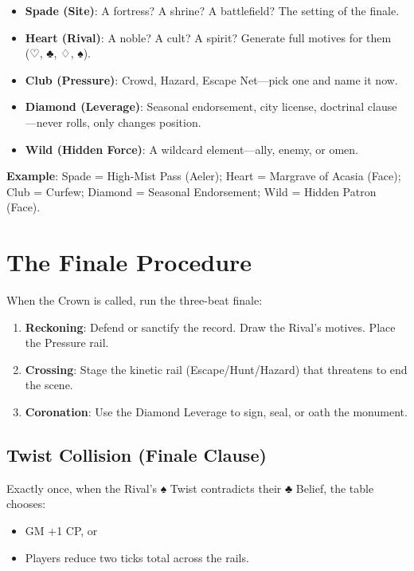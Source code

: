 \begin{itemize}
    \item \textbf{Spade (Site)}: A fortress? A shrine? A battlefield? The setting of the finale.
    \item \textbf{Heart (Rival)}: A noble? A cult? A spirit? Generate full motives for them (♡, ♣, ♢, ♠).
    \item \textbf{Club (Pressure)}: Crowd, Hazard, Escape Net—pick one and name it now.
    \item \textbf{Diamond (Leverage)}: Seasonal endorsement, city license, doctrinal clause—never rolls, only changes position.
    \item \textbf{Wild (Hidden Force)}: A wildcard element—ally, enemy, or omen.
\end{itemize}

\textbf{Example}: Spade = High-Mist Pass (Aeler); Heart = Margrave of Acasia (Face); Club = Curfew; Diamond = Seasonal Endorsement; Wild = Hidden Patron (Face).

\section*{The Finale Procedure}

When the Crown is called, run the three-beat finale:

\begin{enumerate}
    \item \textbf{Reckoning}: Defend or sanctify the record. Draw the Rival's motives. Place the Pressure rail.
    \item \textbf{Crossing}: Stage the kinetic rail (Escape/Hunt/Hazard) that threatens to end the scene.
    \item \textbf{Coronation}: Use the Diamond Leverage to sign, seal, or oath the monument.
\end{enumerate}

\subsection*{Twist Collision (Finale Clause)}

Exactly once, when the Rival's ♠ Twist contradicts their ♣ Belief, the table chooses:

\begin{itemize}
    \item GM +1 CP, or
    \item Players reduce two ticks total across the rails.
\end{itemize}

